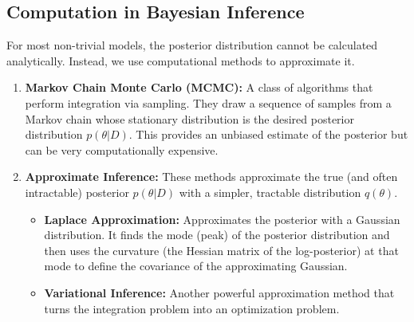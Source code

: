 \documentclass{article}
\begin{document}
\begin{multicols}{2}
\section{Computation in Bayesian Inference} For most non-trivial models, the posterior distribution cannot be calculated analytically. Instead, we use computational methods to approximate it.
\begin{enumerate}
    \item \textbf{Markov Chain Monte Carlo (MCMC):} A class of algorithms that perform integration via sampling. They draw a sequence of samples from a Markov chain whose stationary distribution is the desired posterior distribution $p(\theta|D)$. This provides an unbiased estimate of the posterior but can be very computationally expensive.
    \item \textbf{Approximate Inference:} These methods approximate the true (and often intractable) posterior $p(\theta|D)$ with a simpler, tractable distribution $q(\theta)$.
    \begin{itemize}
        \item \textbf{Laplace Approximation:} Approximates the posterior with a Gaussian distribution. It finds the mode (peak) of the posterior distribution and then uses the curvature (the Hessian matrix of the log-posterior) at that mode to define the covariance of the approximating Gaussian.
        \item \textbf{Variational Inference:} Another powerful approximation method that turns the integration problem into an optimization problem.
    \end{itemize}
\end{enumerate}

\end{multicols}
\end{document}
